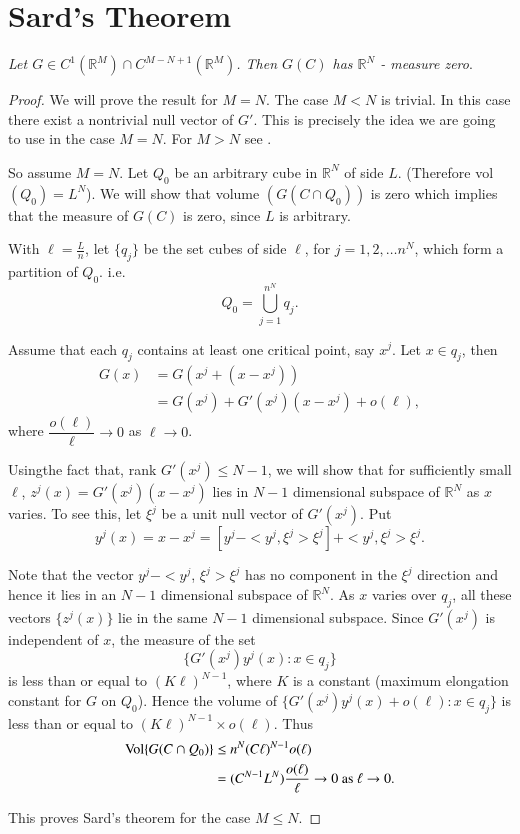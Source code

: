 \section{Sard's Theorem}\label{chap3-sec3.2}%
  
\textit{Let $G \in C^1 ( \mathbb{R}^M) \cap
    C^{M-N+1}(\mathbb{R}^M)$. Then $G(C)$ has $\mathbb{R}^N $ -
    measure zero}. 

\begin{proof}
We will prove the result for $M=N$. The case $M < N$ is trivial. In
this case there exist a nontrivial null vector of $G'$. This is
precisely the idea we are going  to use in the case $M=N$. For $M >N$
see \cite{key1}. 
  
  So assume $M=N$. Let  $Q_0$ be an arbitrary cube in $\mathbb{R}^N$
  of side $L$. (Therefore vol $(Q_0)= L^N$). We will show that volume
  $(G(C \cap Q_0))$ is zero which implies that the measure of $G(C)$
  is zero, since $L$ is arbitrary. 

 
  With $\ell = \frac{L}{n}$, let $\{ q_j\}$ be the set cubes of side
  $\ell$, for $j=1,2 , \ldots n^N$, which form a partition of
  $Q_0$. i.e.  
  $$
  Q_0=\bigcup_{j=1}^{n^N} q_j. 
  $$
  
  Assume that each $q_j$ contains at least one critical point, say
  $x^j$. Let $x \in q_j$, then  
\begin{align*}
G(x) & = G(x^j + (x-x^j))\\
& = G(x^j) + G'(x^j)(x-x^j) + o (\ell ),
\end{align*}  
where $\dfrac{o(\ell)}{\ell} \to 0$ as $\ell \to 0$. 

Using\pageoriginale the fact that, rank $G' (x^j) \le N-1$, we will
show that for  
sufficiently small $\ell$, $z^j(x) = G'(x^j)(x-x^j) $ lies in $N-1$
dimensional subspace of $\mathbb{R}^N$ as $x$ varies. To see this, let
$\xi^j$ be a unit null vector of $G'(x^j)$. Put 
$$
y^j(x) = x-x^j = [y^j - < y^j, \xi^j > \xi^j] + < y^j, \xi^j > 
\xi^j. 
$$

Note that the vector $y^j - < y^j$, $\xi^j > \xi^j$ has no component in
the $\xi^j$ direction and hence it lies in an $N-1$ dimensional
subspace of $\mathbb{R}^N$. As $x$ varies over $q_j$, all these
vectors $\{ z^j(x) \}$ lie in the same $N-1$ dimensional
subspace. Since $G'(x^j)$ is independent of $x$, the measure of the
set  
$$
\{ G' (x^j)y^j(x) : x \in q_j \} 
$$
is less than or equal to $(K \ell)^{N-1}$, where $K$ is a constant
(maximum elongation constant for $G$ on $Q_0$). Hence the volume of
$\{ G' (x^j)y^j (x) + o (\ell): x \in q_j \}$ is less than or equal to
$(K \ell)^{N-1} \times  o(\ell)$. Thus  
\begin{align*}
{\rm Vol} \{ G (C \cap Q_0) \} & \leq n^N (C\ell )^{N-1} o(\ell ) \\ 
& = (C^{N-1} L^{N}) \frac{o(\ell )}{\ell} \rightarrow 0 \text{ as }
\ell \rightarrow 0. 
 \end{align*} 

This proves Sard's theorem for the case $M \leq N$.
\end{proof}

